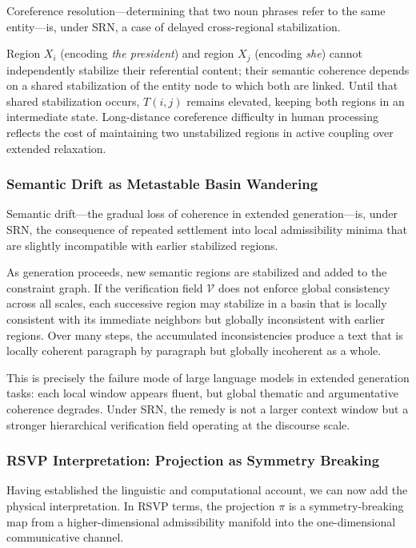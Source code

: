 \documentclass[11pt, a4paper]{article}
\theoremstyle{srn}
\theoremstyle{srnremark}
\begin{document}
Coreference resolution---determining that two noun phrases refer to
the same entity---is, under SRN, a case of delayed cross-regional
stabilization.

Region $X_i$ (encoding \textit{the president}) and region $X_j$
(encoding \textit{she}) cannot independently stabilize their
referential content; their semantic coherence depends on a shared
stabilization of the entity node to which both are linked.
Until that shared stabilization occurs, $T(i,j)$ remains elevated,
keeping both regions in an intermediate state.
Long-distance coreference difficulty in human processing reflects the
cost of maintaining two unstabilized regions in active coupling over
extended relaxation.

\subsubsection*{Semantic Drift as Metastable Basin Wandering}

Semantic drift---the gradual loss of coherence in extended
generation---is, under SRN, the consequence of repeated settlement
into local admissibility minima that are slightly incompatible with
earlier stabilized regions.

As generation proceeds, new semantic regions are stabilized and added
to the constraint graph.
If the verification field $\mathcal{V}$ does not enforce global
consistency across all scales, each successive region may stabilize in
a basin that is locally consistent with its immediate neighbors but
globally inconsistent with earlier regions.
Over many steps, the accumulated inconsistencies produce a text that
is locally coherent paragraph by paragraph but globally incoherent as
a whole.

This is precisely the failure mode of large language models in
extended generation tasks: each local window appears fluent, but
global thematic and argumentative coherence degrades.
Under SRN, the remedy is not a larger context window but a
stronger hierarchical verification field operating at the discourse
scale.

\subsubsection*{RSVP Interpretation: Projection as Symmetry Breaking}

Having established the linguistic and computational account, we can
now add the physical interpretation.
In RSVP terms, the projection $\pi$ is a symmetry-breaking map from
a higher-dimensional admissibility manifold into the one-dimensional
communicative channel.
\end{document}
